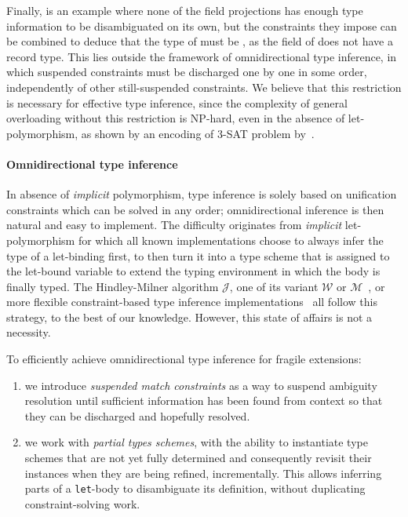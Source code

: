 \documentclass[acmsmall,screen,nonacm,review]{acmart}
\begin{document}
Finally,  is an example where none of the field
projections has enough type information to be disambiguated on its own, but the
constraints they impose can be combined to deduce that the type of
 must be , as the  field of 
does not have a record type. This lies outside the framework of
omnidirectional type inference, in which suspended constraints must be
discharged one by one in some order, independently of other
still-suspended constraints.
%
We believe that this restriction is necessary for effective type inference,
since the complexity of general overloading without this restriction is
NP-hard, even in the absence of let-polymorphism, as shown by an encoding of
3-SAT problem by~\citet*
{Chargueraud-Bodin-Dunfield-Riboulet/jfla2025}.

\paragraph{Omnidirectional type inference}

In absence of \emph{implicit} polymorphism, type inference is solely based
on unification constraints which can be solved in any order;
omnidirectional inference is then natural and easy to implement.  The
difficulty originates from \ML \emph{implicit} let-polymorphism for which all known
implementations choose to always infer the type of a let-binding
first, to then turn it into a type scheme that is assigned to the
let-bound variable to extend the typing environment in which the body
is finally typed. The Hindley-Milner algorithm $\mathcal{J}$, one of
its variant $\mathcal{W}$ or $\mathcal{M}$~\cite
{Lee_Yi/algoM@toplas1998}, or more flexible constraint-based type
inference implementations~\citep* {Remy/mleth,Remy/thesis,
Odersky-Sulzmann-Wehr@tpos, Pottier-Remy/emlti} all follow this strategy, to
the best of our knowledge. However, this state of affairs is not a
necessity.

To efficiently achieve omnidirectional type inference for fragile \ML
extensions:
\begin{enumerate}

\item
  we introduce \emph{suspended match constraints} as a way to suspend
  ambiguity resolution until sufficient information has been found from
  context so that they can be discharged and hopefully resolved.

\item
  we work with \emph{partial types schemes}, \ie with the ability to
  instantiate type
  schemes that are not yet fully determined and consequently revisit their
  instances when they are being refined, incrementally. This allows
  inferring parts of a \texttt{let}-body to disambiguate its definition,
  without duplicating constraint-solving work.

\end{enumerate}
\end{document}
